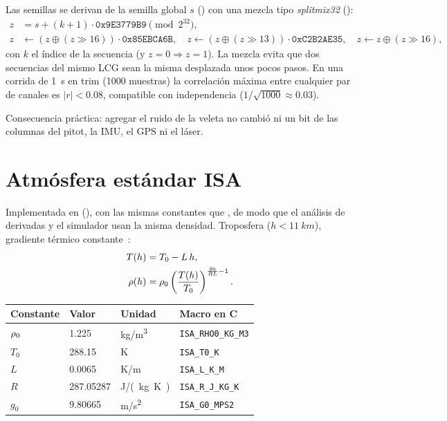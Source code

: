 \documentclass[11pt,a4paper]{article}
\begin{document}
Las semillas se derivan de la semilla global $s$ () con
una mezcla tipo \emph{splitmix32} ():
\begin{align}
  z &= s + (k+1)\cdot\texttt{0x9E3779B9} \pmod{2^{32}},\\
  z &\leftarrow (z \oplus (z \gg 16))\cdot\texttt{0x85EBCA6B},\quad
  z \leftarrow (z \oplus (z \gg 13))\cdot\texttt{0xC2B2AE35},\quad
  z \leftarrow z \oplus (z \gg 16),
\end{align}
con $k$ el índice de la secuencia (y $z=0 \Rightarrow z=1$). La mezcla evita
que dos secuencias del mismo LCG sean la misma desplazada unos pocos pasos.
En una corrida de \SI{1}{s} en trim (1000 muestras) la correlación máxima entre
cualquier par de canales es $|r| < 0.08$, compatible con independencia
($1/\sqrt{1000} \approx 0.03$).

Consecuencia práctica: agregar el ruido de la veleta no cambió ni un bit de las
columnas del pitot, la IMU, el GPS ni el láser.

\section{Atmósfera estándar ISA}
\label{sec:isa}

Implementada en  (),
con las mismas constantes que , de modo que el
análisis de derivadas y el simulador usan la misma densidad. Troposfera
($h < \SI{11}{km}$), gradiente térmico constante~\cite{iso2533}:
\begin{align}
  T(h) &= T_0 - L\,h, \\
  \rho(h) &= \rho_0 \left(\frac{T(h)}{T_0}\right)^{\frac{g_0}{R L} - 1}.
  \label{eq:isa-rho}
\end{align}

\begin{center}
\begin{tabular}{llll}
\toprule
Constante & Valor & Unidad & Macro en C \\
\midrule
$\rho_0$ & 1.225      & \si{kg/m^3}  & \texttt{ISA\_RHO0\_KG\_M3} \\
$T_0$   & 288.15     & \si{K}       & \texttt{ISA\_T0\_K} \\
$L$     & 0.0065     & \si{K/m}     & \texttt{ISA\_L\_K\_M} \\
$R$     & 287.05287  & \si{J/(kg.K)}& \texttt{ISA\_R\_J\_KG\_K} \\
$g_0$   & 9.80665    & \si{m/s^2}   & \texttt{ISA\_G0\_MPS2} \\
\bottomrule
\end{tabular}
\end{center}
\end{document}
